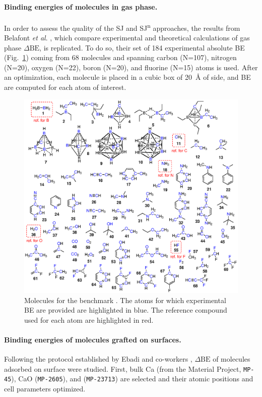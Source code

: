 \documentclass[12pt,a4paper]{article}
\def\dbe{\ensuremath{\Delta\text{BE}}}
\begin{document}
\paragraph{Binding energies of molecules in gas phase.} In order to assess the quality of the SJ and SJ\textsuperscript{n} approaches, the results from  Belafont \textit{et al}. \cite{pueyobellafontPredictingCoreLevel2017}, which compare experimental and theoretical calculations of gas phase \dbe, is replicated. To do so, their set of 184 experimental absolute BE (Fig.~\ref{fig:core185}) coming from 68 molecules and spanning carbon (N=107), nitrogen (N=20), oxygen (N=22), boron (N=20), and fluorine (N=15) atoms is used. After an optimization, each molecule is placed in a cubic box of \SI{20}{\angstrom} of side, and BE are computed for each atom of interest.

\begin{figure}[!h]
	\centering
	\includegraphics[width=\linewidth]{Figure3}
	\caption{Molecules for the benchmark \cite{pueyobellafontPredictingCoreLevel2017}. The atoms for which experimental BE are provided are highlighted in blue.  The reference compound used for each atom are highlighted in red.}
	\label{fig:core185}
\end{figure}

\paragraph{Binding energies of molecules grafted on surfaces.} Following the protocol established by Ebadi and co-workers \cite{ebadiInsightsLiMetalOrganic2019}, \dbe{} of molecules adsorbed on surface were studied. First, bulk Ca (from the Material Project, \texttt{MP-45}), CaO (\texttt{MP-2605}), and  (\texttt{MP-23713}) are selected and their atomic positions and cell parameters optimized.
\end{document}
